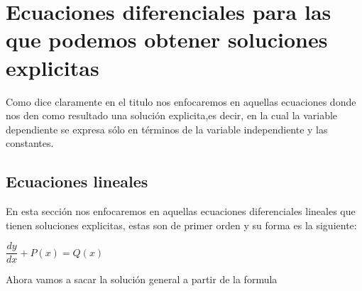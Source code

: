 \documentclass[10pt,a4paper]{article}
\begin{document}
\section{Ecuaciones diferenciales para las que podemos obtener soluciones explicitas} 
Como dice claramente en el titulo nos enfocaremos en aquellas ecuaciones donde nos den como resultado una solución explicita,es decir, en la cual la variable dependiente se expresa sólo en términos de la variable independiente y las constantes.
  
  \subsection{Ecuaciones lineales}
  
  En esta sección nos enfocaremos en aquellas ecuaciones diferenciales lineales que tienen soluciones explicitas, estas son de primer orden y su forma es la siguiente:\\
  \begin{center}
  $\dfrac{dy}{dx}+P(x)=Q(x)$
  \end{center}
  Ahora vamos a sacar la solución general a partir de la formula 
\end{document}
